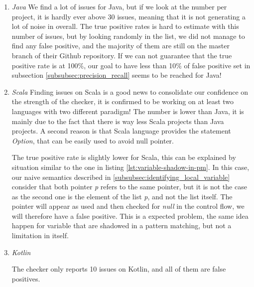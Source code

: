 \begin{enumerate}
	\item \textit{Java} \newline
	We find a lot of issues for Java, but if we look at the number per project, it is hardly ever above 30 issues, meaning that it is not generating a lot of noise in overall.
	The true positive rates is hard to estimate with this number of issues, but by looking randomly in the list, we did not manage to find any false positive, and the majority of them are still on the master branch of their Github repository. 
	If we can not guarantee that the true positive rate is at 100\%, our goal to have less than 10\% of false positive set in subsection \ref{subsubsec:precision_recall} seems to be reached for Java! \newline
	\item \textit{Scala} \newline
	Finding issues on Scala is a good news to consolidate our confidence on the strength of the checker, it is confirmed to be working on at least two languages with two different paradigm!
	The number is lower than Java, it is mainly due to the fact that there is way less Scala projects than Java projects.
	A second reason is that Scala language provides the statement \emph{Option}, that can be easily used to avoid null pointer.
	
	
	
	The true positive rate is slightly lower for Scala, this can be explained by situation similar to the one in listing \ref{lst:variable-shadow-in-pm}. 
	In this case, our naive semantics described in \ref{subsubsec:identifying_local_variable} consider that both pointer \emph{p} refers to the same pointer, but it is not the case as the second one is the element of the list \emph{p}, and not the list itself.
	The pointer will appear as used and then checked for \emph{null} in the control flow, we will therefore have a false positive.
	This is a expected problem, the same idea happen for variable that are shadowed in a pattern matching, but not a limitation in itself.
	
	\item \textit{Kotlin}
	
	The checker only reports 10 issues on Kotlin, and all of them are false positives.
	
	
	

\end{enumerate}
